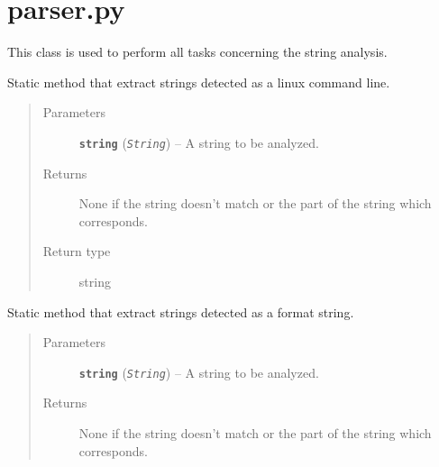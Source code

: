 \documentclass[letterpaper,10pt,oneside]{sphinxmanual}
\begin{document}
\section{parser.py}
\label{index:parser-py}\label{index:module-lib.parser}

\begin{fulllineitems}
\label{index:lib.parser.Parser}
This class is used to perform all tasks concerning the string analysis.

\begin{fulllineitems}
\label{index:lib.parser.Parser.getCmd}
Static method that extract strings detected as a linux command line.
\begin{quote}\begin{description}
\item[{Parameters}] \leavevmode
\textbf{\texttt{string}} (\emph{\texttt{String}}) -- A string to be analyzed.

\item[{Returns}] \leavevmode
None if the string doesn't match or the part of the string
which corresponds.

\item[{Return type}] \leavevmode
string

\end{description}\end{quote}

\end{fulllineitems}


\begin{fulllineitems}
\label{index:lib.parser.Parser.getFormatStr}
Static method that extract strings detected as a format string.
\begin{quote}\begin{description}
\item[{Parameters}] \leavevmode
\textbf{\texttt{string}} (\emph{\texttt{String}}) -- A string to be analyzed.

\item[{Returns}] \leavevmode
None if the string doesn't match or the part of the string
which corresponds.


\end{description}
\end{quote}
\end{fulllineitems}
\end{fulllineitems}
\end{document}
